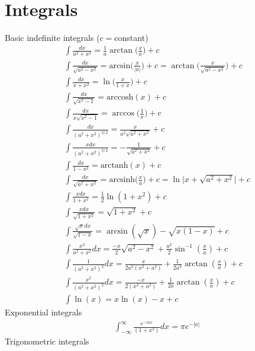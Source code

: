 \chapter{Integrals}
\thispagestyle{fancy}
Basic indefinite integrals ($c=$constant)
\begin{align}
	&\int \frac{dx}{a^2+x^2} = \frac{1}{a}\arctan\bigg(\frac{x}{a}\bigg) +c\\
	&\int \frac{dx}{\sqrt{a^2-x^2}}= \textrm{arcsin}\bigg(\frac{x}{|a|} \bigg)+c =\arctan\bigg(\frac{x}{\sqrt{a^2-x^2}} \bigg)+c\\
	&\int \frac{dx}{x+x^2} =\ln\bigg(\frac{x}{1+x} \bigg) +c\\
	&\int \frac{dx}{\sqrt{x^2-1}}= \textrm{arccosh}(x) +c\\
	&\int \frac{dx}{x\sqrt{x^2-1}}= \arccos\bigg(\frac{1}{x}\bigg)+c \\
	&\int \frac{dx}{(a^2+x^2)^{3/2}} = \frac{x}{a^2\sqrt{a^2+x^2}} +c\\
	&\int \frac{xdx}{(a^2+x^2)^{3/2}} = -\frac{1}{\sqrt{a^2+x^2}} +c\\
	&\int \frac{dx}{1-x^2} = \textrm{arctanh}(x) +c\\
	&\int \frac{dx}{\sqrt{a^2+x^2}} = \textrm{arcsinh}\bigg(\frac{x}{a}\bigg) +c = \ln\big|x+\sqrt{a^2+x^2}\big|+c\\
	&\int \frac{xdx}{1+x^2} =\frac{1}{2}\ln(1+x^2) +c\\
	&\int \frac{xdx}{\sqrt{1+x^2}}= \sqrt{1+x^2} +c\\
	&\int \frac{\sqrt{x}dx}{\sqrt{1-x}}= \arcsin(\sqrt{x})-\sqrt{x(1-x)} +c\\
	&\int \frac{x^2}{a^2+x^2} dx=\frac{-x}{2}\sqrt{a^2-x^2}+\frac{a^2}{2}\sin^{-1}\left(\frac{x}{a}\right)+c\\
	&\int \frac{1}{(a^2+x^2)^2}dx = \frac{x}{2a^2(x^2+a^2)}+\frac{1}{2a^3}\arctan\left(\frac{x}{a}\right) +c \\
	&\int \frac{x^2}{(a^2+x^2)^2}dx = \frac{-x}{2(x^2+a^2)}+\frac{1}{2a}\arctan\left(\frac{x}{a}\right) +c \\
	&\int \ln(x)=x\ln(x)-x+c 
\end{align}
Exponential integrals
\begin{align}
	&\int_{-\infty}^{\infty} \frac{e^{-iax}}{(1+x^2)}dx = \pi e^{-|a|}
\end{align}
Trigonometric integrals 
